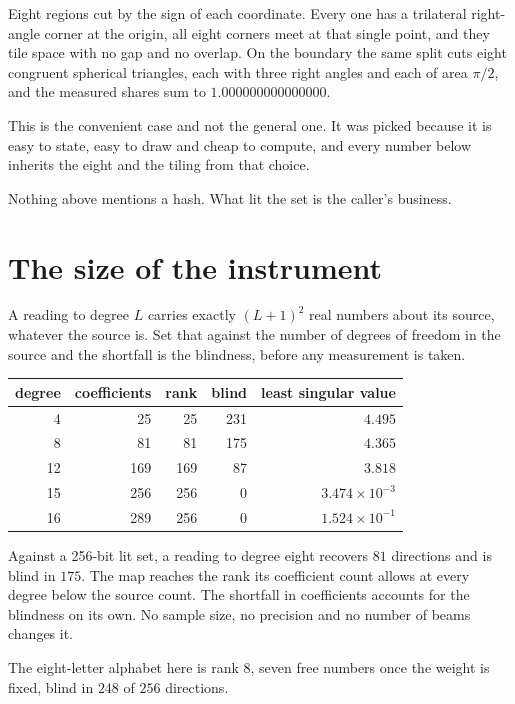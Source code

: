 Eight regions cut by the sign of each coordinate. Every one has a trilateral right-angle corner at the origin, all eight corners meet at that single point, and they tile space with no gap and no overlap. On the boundary the same split cuts eight congruent spherical triangles, each with three right angles and each of area \(\pi/2\), and the measured shares sum to \(1.000000000000000\).

This is the convenient case and not the general one. It was picked because it is easy to state, easy to draw and cheap to compute, and every number below inherits the eight and the tiling from that choice.

Nothing above mentions a hash. What lit the set is the caller's business.

\section{The size of the instrument}

A reading to degree \(L\) carries exactly \((L+1)^2\) real numbers about its source, whatever the source is. Set that against the number of degrees of freedom in the source and the shortfall is the blindness, before any measurement is taken.

\begin{center}
\begin{tabular}{@{}rrrrr@{}}
\toprule
degree & coefficients & rank & blind & least singular value \\
\midrule
4 & 25 & 25 & 231 & \(4.495\) \\
8 & 81 & 81 & 175 & \(4.365\) \\
12 & 169 & 169 & 87 & \(3.818\) \\
15 & 256 & 256 & 0 & \(3.474 \times 10^{-3}\) \\
16 & 289 & 256 & 0 & \(1.524 \times 10^{-1}\) \\
\bottomrule
\end{tabular}
\end{center}

Against a 256-bit lit set, a reading to degree eight recovers \(81\) directions and is blind in \(175\). The map reaches the rank its coefficient count allows at every degree below the source count. The shortfall in coefficients accounts for the blindness on its own. No sample size, no precision and no number of beams changes it.

The eight-letter alphabet here is rank \(8\), seven free numbers once the weight is fixed, blind in \(248\) of \(256\) directions.

